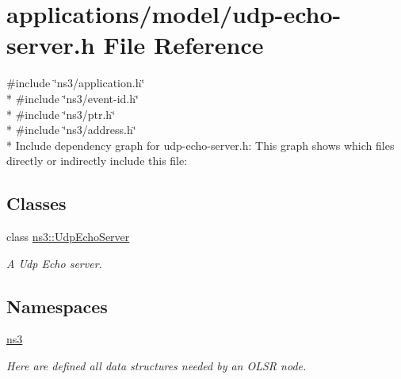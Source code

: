 \hypertarget{udp-echo-server_8h}{}\section{applications/model/udp-\/echo-\/server.h File Reference}
\label{udp-echo-server_8h}
{\ttfamily \#include \char`\"{}ns3/application.\+h\char`\"{}}\\*
{\ttfamily \#include \char`\"{}ns3/event-\/id.\+h\char`\"{}}\\*
{\ttfamily \#include \char`\"{}ns3/ptr.\+h\char`\"{}}\\*
{\ttfamily \#include \char`\"{}ns3/address.\+h\char`\"{}}\\*
Include dependency graph for udp-\/echo-\/server.h\+:
This graph shows which files directly or indirectly include this file\+:
\subsection*{Classes}
\begin{DoxyCompactItemize}
\item 
class \hyperlink{classns3_1_1UdpEchoServer}{ns3\+::\+Udp\+Echo\+Server}
\begin{DoxyCompactList}\small\item\em A Udp Echo server. \end{DoxyCompactList}\end{DoxyCompactItemize}
\subsection*{Namespaces}
\begin{DoxyCompactItemize}
\item 
 \hyperlink{namespacens3}{ns3}
\begin{DoxyCompactList}\small\item\em Here are defined all data structures needed by an O\+L\+SR node. \end{DoxyCompactList}\end{DoxyCompactItemize}

